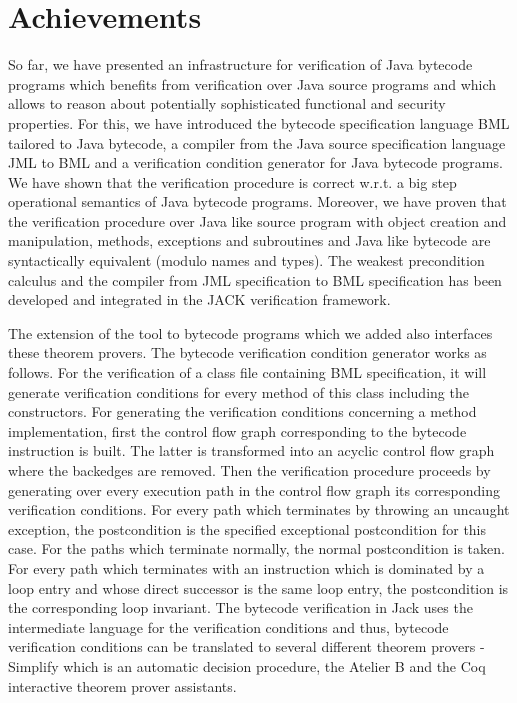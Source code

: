 
\section{Achievements}
So far, we have  presented an infrastructure for verification of Java bytecode programs 
which benefits from verification over Java source programs and which allows to reason about potentially
sophisticated  functional and security properties.
 For this, we have 
introduced the bytecode specification language BML tailored to Java bytecode, a compiler
from the Java source specification language JML to BML and a verification 
condition generator for Java bytecode programs. 
We have shown that the verification procedure is correct w.r.t. a big step  operational semantics of Java bytecode programs. 
Moreover, we have
proven that the verification procedure over Java like source program with object creation and manipulation,
 methods, exceptions and subroutines
and Java like bytecode are syntactically equivalent (modulo names and types). 
 The weakest precondition calculus and the compiler from JML specification to BML specification has been 
developed and integrated in the JACK verification framework.

 The extension of the tool to bytecode programs which we added also interfaces these theorem provers. The bytecode 
verification condition generator works as follows. For the verification of a class file containing BML specification, it will generate verification conditions for every
 method of this class including the constructors. For generating the verification conditions concerning a method implementation, first the control flow
 graph corresponding to the bytecode instruction is built. The latter is transformed into an acyclic control flow graph where the backedges are 
removed.
 Then the verification procedure proceeds by generating over every execution path in the control flow graph its corresponding verification conditions. 
For every path which terminates by throwing an uncaught exception, the postcondition is the specified exceptional postcondition for this case. For the paths which terminate normally, 
the normal postcondition is taken. For every path which terminates with an instruction which is dominated by a loop entry and whose direct successor is the same loop entry, the postcondition 
is the corresponding loop invariant. The bytecode verification in Jack uses the intermediate language for the verification conditions and thus, bytecode verification conditions 
 can be translated to several different theorem provers - Simplify \cite{Simpl05DNS} which is an automatic decision procedure, 
the Atelier B and the Coq interactive theorem prover assistants. 


